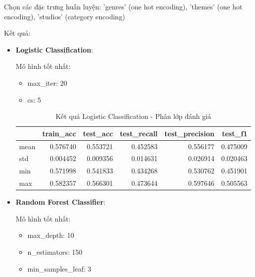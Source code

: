     \FloatBarrier

    Chọn các đặc trưng huấn luyện: 'genres' (one hot encoding), 'themes' (one hot encoding), 'studios' (category encoding)

    Kết quả:

    \begin{itemize}
        \item \textbf{Logistic Classification}: 
        
            Mô hình tốt nhất:
            \begin{itemize}
                \item max\_iter: 20
                \item cs: 5
            \end{itemize}

            \begin{table}[htbp]
            \centering
            \caption{Kết quả Logistic Classification - Phân lớp đánh giá}
            \label{tab:mal-score-LogCV}
            \begin{tabular}{lrrrrr}
                \hline
                & train\_acc & test\_acc & test\_recall & test\_precision & test\_f1 \\
                \hline
                mean & 0.576740 & 0.553721 & 0.452583 & 0.556177 & 0.475009 \\
                std & 0.004452 & 0.009356 & 0.014631 & 0.026914 & 0.020463 \\
                min & 0.571998 & 0.541833 & 0.434268 & 0.530762 & 0.451901 \\
                max & 0.582357 & 0.566301 & 0.473644 & 0.597646 & 0.505563 \\
                \hline
            \end{tabular}
            \end{table}
  
            
            \FloatBarrier
            
        \item \textbf{Random Forest Classifier}:

            Mô hình tốt nhất:
            \begin{itemize}
                \item max\_depth: 10
                \item n\_estimators: 150
                \item min\_samples\_leaf: 3
            \end{itemize}


\end{itemize}
